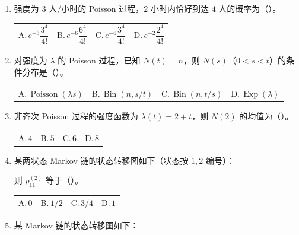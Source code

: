 \documentclass[UTF8,zihao=5,fontset=fandol]{ctexart}
\makeatletter
\newcommand{\fourchoices}[4]{%
  \begin{tabularx}{\linewidth}{@{}X X X X@{}}
    A.\,#1 & B.\,#2 & C.\,#3 & D.\,#4
  \end{tabularx}}
\makeatother
\begin{document}
\newpage
\begin{enumerate}[start=4]
  \item 强度为 $3$ 人/小时的 Poisson 过程，$2$ 小时内恰好到达 $4$ 人的概率为（\hspace{1.5em}）。

        \fourchoices{$e^{-3}\dfrac{3^4}{4!}$}{$e^{-6}\dfrac{6^4}{4!}$}{$e^{-6}\dfrac{3^4}{4!}$}{$e^{-2}\dfrac{2^4}{4!}$}

  \item 对强度为 $\lambda$ 的 Poisson 过程，已知 $N(t)=n$，则 $N(s)$（$0<s<t$）的条件分布是（\hspace{1.5em}）。

        \fourchoices{$\operatorname{Poisson}(\lambda s)$}{$\operatorname{Bin}(n,s/t)$}{$\operatorname{Bin}(n,t/s)$}{$\operatorname{Exp}(\lambda)$}

  \item 非齐次 Poisson 过程的强度函数为 $\lambda(t)=2+t$，则 $N(2)$ 的均值为（\hspace{1.5em}）。

        \fourchoices{$4$}{$5$}{$6$}{$8$}

  \item 某两状态 Markov 链的状态转移图如下（状态按 $1,2$ 编号）：

        \begin{center}
        \end{center}
        则 $p_{11}^{(2)}$ 等于（\hspace{1.5em}）。

        \fourchoices{$0$}{$1/2$}{$3/4$}{$1$}

  \item 某 Markov 链的状态转移图如下：


\end{enumerate}
\end{document}
